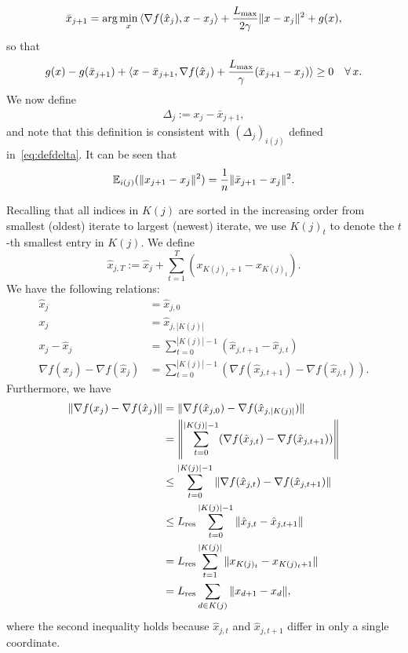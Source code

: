 \documentclass{siamltex}
\begin{document}
\[
\bar{x}_{j+1}=\arg\min_x \, \langle \nabla f({\hat{x}}_{j}), x- x_j\rangle +
    {{L_{\mbox{\rm\scriptsize max}}} \over 2\gamma}\|x-x_j\|^2 + g(x),
\]
so that
\begin{align}
g(x) - g(\bar{x}_{j+1}) + \langle x-\bar{x}_{j+1},  \nabla f({\hat{x}}_{j}) + \frac{L_{\mbox{\rm\scriptsize max}}}{\gamma}(\bar{x}_{j+1}-x_j) \rangle \geq 0\quad \forall \, x.
\label{eqn_pre_3}
\end{align}
We now define 
\begin{align}
\Delta_j:=x_j-\bar{x}_{j+1},
\label{eq:Delta}
\end{align} 
and note that this definition is consistent with $(\Delta_j)_{i(j)}$
defined in~\eqref{eq:defdelta}. It can be seen that
\begin{align}
{\mathbb{E}}_{i(j)} (\|x_{j+1}-x_j\|^2) = {1\over n} \|\bar{x}_{j+1}- x_j\|^2.
\label{eq:expdel}
\end{align}

Recalling that all indices in $K(j)$ are sorted in the increasing
order from smallest (oldest) iterate to largest (newest) iterate, we
use $K(j)_t$ to denote the $t$-th smallest entry in $K(j)$. We define
\[
{\hat{x}}_{j, T} := {\hat{x}}_{j} + \sum_{t=1}^T(x_{K(j)_t + 1} - x_{K(j)_t}).
\]
We have the following relations:
\begin{align*}
{\hat{x}}_{j} &= {\hat{x}}_{j, 0}\\
x_{j} &= {\hat{x}}_{j, |K(j)|}\\
x_j-{\hat{x}}_{j} &= \sum_{t=0}^{|K(j)|-1}({\hat{x}}_{j, t+1} - {\hat{x}}_{j, t})\\
\nabla f(x_j)-\nabla f({\hat{x}}_{j})&=\sum_{t=0}^{|K(j)|-1}(\nabla f({\hat{x}}_{j, t+1}) - \nabla f({\hat{x}}_{j, t})).
\end{align*}
{{\color{black}} Furthermore, we have}
\begin{align}
\|\nabla f(x_j) - \nabla f({\hat{x}}_{j})\| &= \|\nabla f({\hat{x}}_{j,0})-\nabla f({\hat{x}}_{j, |K(j)|})\|\nonumber \\
\quad & 
=\left\|\sum_{t=0}^{|K(j)|-1} (\nabla f({\hat{x}}_{j, t}) - \nabla f({\hat{x}}_{j, t+1}))\right\| \nonumber\\
\quad & 
\leq \sum_{t=0}^{|K(j)|-1}\|\nabla f({\hat{x}}_{j, t}) - \nabla f({\hat{x}}_{j, t+1})\| \nonumber\\
\quad &
\leq {L_{\mbox{\rm\scriptsize res}}} \sum_{t=0}^{|K(j)|-1}\|{\hat{x}}_{j, t} - {\hat{x}}_{j, t+1}\| \nonumber\\
\quad &
= {L_{\mbox{\rm\scriptsize res}}} \sum_{t=1}^{|K(j)|} \|x_{K(j)_t}-x_{K(j)_t+1}\| \nonumber \\
\quad & 
= {L_{\mbox{\rm\scriptsize res}}} \sum_{d\in K(j)} \|x_{d+1}-x_{d}\|, 
\label{eqn_gbound}
\end{align}
where the second inequality holds because ${\hat{x}}_{j,t}$ and ${\hat{x}}_{j,
  t+1}$ differ in only a single coordinate.
\medskip
\end{document}
